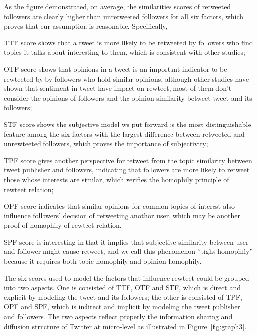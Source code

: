 \documentclass{acm_proc_article-sp}
\begin{document}
As the figure demonstrated, on average, the similarities scores of retweeted followers are clearly higher than unretweeted followers for all six factors, which proves that our assumption is reasonable. Specifically,
\begin{itemize*}
\item TTF score shows that a tweet is more likely to be retweeted by followers who find topics it talks about interesting to them, which is consistent with other studies\cite{conf/icwsm/MacskassyM11, conf/wsdm/FengW13};
\item OTF score shows that opinions in a tweet is an important indicator to be rewteeted by by followers who hold similar opinions, although other studies\cite{conf/icwsm/PfitznerGS12,2011:NaveedGKC} have shown that sentiment in tweet have impact on rewteet, most of them don't consider the opinions of followers and the opinion similarity betweet tweet and its followers;
\item STF score shows the subjective model we put forward is the most distinguishable feature among the six factors with the largest difference between retweeted and unrewteeted followers, which proves the importance of subjectivity;
\item TPF score gives another perspective for retweet from the topic similarity between tweet publisher and followers, indicating that followers are more likely to retweet those whose interests are similar, which verifies the homophily principle of rewteet relation;
\item OPF score indicates that similar opinions for common topics of interest also influence followers' decision of retweeting anothor user, which may be another proof of homophily of rewteet relation.
\item SPF score is interesting in that it implies that subjective similarity between user and follower might cause retweet, and we call this phenomenon ``tight homophily'' because it requires both topic homophily and opinion homophily.
\end{itemize*} 
The six scores used to model the factors that influence rewteet could be grouped into two aspects. 
One is consisted of TTF, OTF and STF, which is direct and explicit by modeling the tweet and its followers;
the other is consisted of TPF, OPF and SPF, which is indirect and implicit by modeling the tweet publisher and followers.
The two aspects reflect properly the information sharing and diffusion structure of Twitter at micro-level as illustrated in Figure~\ref{fig:graph3}.
\end{document}
